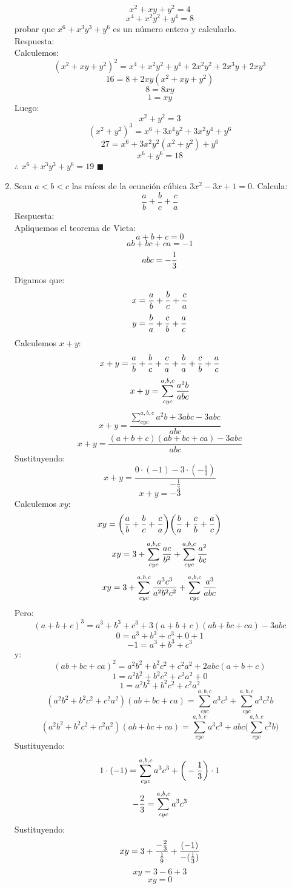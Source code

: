\documentclass{book}
\begin{document}
\begin{enumerate}
        $$x^2+xy+y^2=4$$
        $$x^4+x^2y^2+y^4=8$$
        probar que $x^6 + x^3y^3 + y^6$ es un número entero y calcularlo.\\
        Respuesta:\\
        Calculemos:
        $${( x^2 + xy + y^2 )}^2=x^4 +x^2 y^2 +y^4+2x^2 y^2+2x^3 y+2xy^3$$
        $$16=8+2xy( x^2 + xy + y^2  )$$
        $$8=8xy$$
        $$1=xy$$
        Luego:
        $$ x^2 + y^2=3$$
        $${(x^2 + y^2 )}^3=x^6+3x^4 y^2+3x^2 y^4+y^6$$
        $$27=x^6+3x^2 y^2 (x^2+y^2 )+y^6$$
        $$x^6 + y^6=18$$
        $\therefore$ $x^6 + x^3 y^3 + y^6=19$ $\blacksquare$\\
        \item Sean $a < b < c$ las raíces de la ecuación cúbica $3x^2-3x+1=0$. Calcula:
        $$\frac{a}{b}+\frac{b}{c}+\frac{c}{a}$$
        Respuesta:\\
        Apliquemos el teorema de Vieta:
        $$a+b+c=0$$
        $$ab+bc+ca=-1$$
        $$abc=-{1\over 3}$$
        Digamos que:
        $$x={a\over b}+{b\over c}+{c\over a}$$
        $$y={b\over a}+{c\over b}+{a\over c}$$
        Calculemos $x+y$:
        $$x+y={a\over b}+{b\over c}+{c\over a}+{b\over a}+{c\over b}+{a\over c}$$
        $$x+y=\sum_{cyc}^{a,b,c}{a^2 b\over abc}$$
        $$x+y=\frac{\sum_{cyc}^{a,b,c}a^2 b+3abc-3abc}{abc}$$
        $$x+y=\frac{(a+b+c)(ab+bc+ca)-3abc}{abc}$$
        Sustituyendo:
        $$x+y=\frac{0\cdot(-1)-3\cdot(-\frac{1}{3})}{-\frac{1}{3}}$$
        $$x+y=-3$$
        Calculemos $xy$:
        $$xy=\bigg({a\over b}+{b\over c}+{c\over a}\bigg)\bigg({b\over a}+{c\over b}+{a\over c}\bigg)$$
        $$xy=3+\sum_{cyc}^{a,b,c}{ac\over b^2} +\sum_{cyc}^{a,b,c}{ a^2\over bc}$$
        $$xy=3+\sum_{cyc}^{a,b,c}\frac{a^3 c^3}{a^2 b^2 c^2}+\sum_{cyc}^{a,b,c}{ a^3\over abc}$$
        Pero:
        $${(a+b+c)}^3=a^3+b^3+c^3+3(a+b+c)(ab+bc+ca)-3abc$$
        $$0=a^3+b^3+c^3+0+1$$
        $$-1=a^3+b^3+c^3$$
        y:
        $${(ab+bc+ca)}^2=a^2 b^2+b^2 c^2+c^2 a^2+2abc(a+b+c)$$
        $$1=a^2 b^2+b^2 c^2+c^2 a^2+0$$
        $$1=a^2 b^2+b^2 c^2+c^2 a^2$$
        $$(a^2 b^2+b^2 c^2+c^2 a^2 )(ab+bc+ca)=\sum_{cyc}^{a,b,c}a^3 c^3+\sum_{cyc}^{a,b,c}a^3 c^2 b$$
        $$(a^2 b^2+b^2 c^2+c^2 a^2 )(ab+bc+ca)=\sum_{cyc}^{a,b,c}a^3 c^3+abc\bigg(\sum_{cyc}^{a,b,c}c^2 b \bigg)$$
        Sustituyendo:
        $$1\cdot(-1)=\sum_{cyc}^{a,b,c}a^3 c^3 +\bigg(-{1\over 3}\bigg)\cdot 1$$
        $$-{2\over 3}=\sum_{cyc}^{a,b,c}a^3 c^3$$
        Sustituyendo:
        $$xy=3+\frac{-{2\over 3}}{{1\over 9}}+{(-1)\over-({1\over 3})}$$
        $$xy=3-6+3$$
        $$xy=0$$

\end{enumerate}
\end{document}
